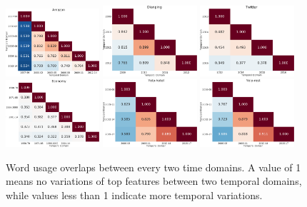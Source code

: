 \begin{figure}[tb!]
\centering
\includegraphics[width=0.31\textwidth]{images/chapter3/lang_use/amazon.pdf}
\includegraphics[width=0.31\textwidth]{images/chapter3/lang_use/dianping.pdf}
\includegraphics[width=0.31\textwidth]{images/chapter3/lang_use/vaccine.pdf}
\newline
\includegraphics[width=0.31\textwidth]{images/chapter3/lang_use/economy.pdf}
\includegraphics[width=0.31\textwidth]{images/chapter3/lang_use/yelp_hotel.pdf}
\includegraphics[width=0.31\textwidth]{images/chapter3/lang_use/yelp_rest.pdf}
\caption{Word usage overlaps between every two time domains. A value of 1 means no variations of top features between two temporal domains, while values less than 1 indicate more temporal variations.}
\label{chap3:fig:lang}
\end{figure}

